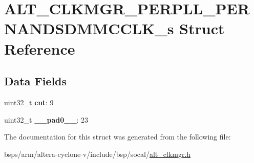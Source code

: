 \hypertarget{structALT__CLKMGR__PERPLL__PERNANDSDMMCCLK__s}{}\section{A\+L\+T\+\_\+\+C\+L\+K\+M\+G\+R\+\_\+\+P\+E\+R\+P\+L\+L\+\_\+\+P\+E\+R\+N\+A\+N\+D\+S\+D\+M\+M\+C\+C\+L\+K\+\_\+s Struct Reference}
\label{structALT__CLKMGR__PERPLL__PERNANDSDMMCCLK__s}
\subsection*{Data Fields}
\begin{DoxyCompactItemize}
\item 
\mbox{\label{structALT__CLKMGR__PERPLL__PERNANDSDMMCCLK__s_a388216e21de982cd33a9438dbef9f05d}} 
uint32\+\_\+t {\bfseries cnt}\+: 9
\item 
\mbox{\label{structALT__CLKMGR__PERPLL__PERNANDSDMMCCLK__s_aef75b55111ffaea3adadf1a0529c20b8}} 
uint32\+\_\+t {\bfseries \+\_\+\+\_\+pad0\+\_\+\+\_\+}\+: 23
\end{DoxyCompactItemize}


The documentation for this struct was generated from the following file\+:\begin{DoxyCompactItemize}
\item 
bsps/arm/altera-\/cyclone-\/v/include/bsp/socal/\mbox{\hyperlink{alt__clkmgr_8h}{alt\+\_\+clkmgr.\+h}}\end{DoxyCompactItemize}
